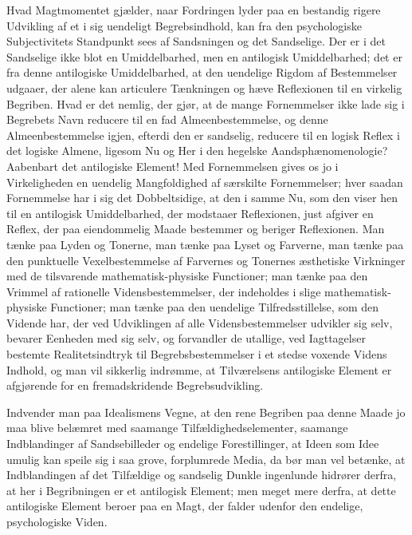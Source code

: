 \documentclass[12pt]{book}
\newcommand{\opage}[1]{\marginnote{\footnotesize\textit{[#1]}}}
\begin{document}
Hvad Magtmomentet gjælder, naar Fordringen lyder paa en bestandig rigere Udvikling af et i sig
uendeligt Begrebsindhold, kan fra den psychologiske Subjectivitets Standpunkt sees af Sandsningen
og det Sandselige. Der er i det Sandselige ikke blot en Umiddelbarhed, men en antilogisk
Umiddelbarhed; det er fra denne antilogiske Umiddelbarhed, at den uendelige Rigdom af
Bestemmelser udgaaer, der alene kan articulere Tænkningen og hæve Reflexionen til en virkelig
Begriben. Hvad er det nemlig, der gjør, at de mange Fornemmelser ikke lade sig i Begrebets Navn
reducere til en fad Almeenbestemmelse, og denne Almeenbestemmelse igjen, efterdi den er sandselig,
reducere til en logisk Reflex i det logiske Almene, ligesom Nu og Her i den hegelske
Aandsphænomenologie? Aabenbart det antilogiske Element! Med Fornemmelsen gives os jo i
Virkeligheden en uendelig Mangfoldighed af særskilte Fornemmelser; hver saadan Fornemmelse har i
sig det Dobbeltsidige, at den i samme Nu, som den
\opage{190} viser hen til en antilogisk Umiddelbarhed, der modstaaer Reflexionen, just afgiver en Reflex, der
paa eiendommelig Maade bestemmer og beriger Reflexionen. Man tænke paa Lyden og Tonerne, man
tænke paa Lyset og Farverne, man tænke paa den punktuelle Vexelbestemmelse af Farvernes og
Tonernes æsthetiske Virkninger med de tilsvarende mathematisk-physiske Functioner; man tænke paa
den Vrimmel af rationelle Vidensbestemmelser, der indeholdes i slige mathematisk-physiske
Functioner; man tænke paa den uendelige Tilfredsstillelse, som den Vidende har, der ved
Udviklingen af alle Vidensbestemmelser udvikler sig selv, bevarer Eenheden med sig selv, og
forvandler de utallige, ved Iagttagelser bestemte Realitetsindtryk til Begrebsbestemmelser i et
stedse voxende Videns Indhold, og man vil sikkerlig indrømme, at Tilværelsens antilogiske Element
er afgjørende for en fremadskridende Begrebsudvikling.

Indvender man paa Idealismens Vegne, at den rene Begriben paa denne Maade jo maa blive belæmret
med saamange Tilfældighedselementer, saamange Indblandinger af Sandsebilleder og endelige
Forestillinger, at Ideen som Idee umulig kan speile sig i saa grove, forplumrede Media, da bør man
vel betænke, at Indblandingen af det Tilfældige og sandselig Dunkle ingenlunde hidrører derfra, at
her i Begribningen er et antilogisk Element; men meget mere derfra, at dette antilogiske Element
beroer paa en Magt, der falder udenfor den endelige, psychologiske Viden.
\end{document}
